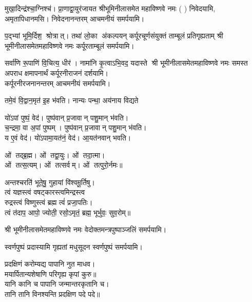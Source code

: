 \begin{center}
 {मुखा॒दिन्द्र॑श्चा॒ग्निश्च॑। प्रा॒णाद्वा॒युर॑जायत}
श्रीभूमिनीलासमेत महाविष्णवे नमः (	) निवेदयामि, \\
अमृतापिधानमसि। निवेदनानन्तरम् आचमनीयं समर्पयामि।\medskip

{प॒द्भ्यां भूमि॒र्दिश॒ श्रोत्रात्। तथा॑ लो॒का अ॑कल्पयन्}
{कर्पूरचूर्णसंयुक्तं ताम्बूलं प्रतिगृह्यताम्}
श्री भूमीनीलासमेतमहाविष्णवे नमः कर्पूरताम्बूलं समर्पयामि।\medskip

{सर्वा॑णि रू॒पाणि॑ वि॒चित्य॒ धीर॑। नामा॑नि कृ॒त्वाऽभि॒वद॒\an{} यदास्ते}
श्री भूमीनीलासमेतमहाविष्णवे नमः समस्त अपराध क्षमापनार्थं कर्पूरनीराजनं दर्शयामि।\\
कर्पूरनीरजनानन्तरम् आचमनीयं समर्पयामि।\medskip

 {तमे॒वं वि॒द्वान॒मृत॑ इ॒ह भ॑वति। नान्यः पन्था॒ अय॑नाय विद्यते}

 यो॑ऽपां पुष्पं॒ वेद॑। पुष्प॑वान् प्र॒जावान् पशु॒मान् भ॑वति।\\
च॒न्द्रमा॒ वा अ॒पां पुष्पम्। पुष्प॑वान् प्र॒जावान् पशु॒मान् भ॑वति।\\
य ए॒वं वेद॑। यो॑ऽपामा॒यत॑नं॒ वेद॑। आ॒यत॑नवान् भवति।\medskip

ओं तद्ब्र॒ह्म। ओं तद्वा॒युः। ओं तदा॒त्मा।\\ ओं तत्स॒त्यम्‌।
ओं तत्सर्वम्‌। ओं तत्पुरो॒र्नमः॥\medskip

अन्तश्चरति॑ भूते॒षु॒ गुहायां वि॑श्वमू॒र्तिषु। \\
त्वं यज्ञस्त्वं वषट्कारस्त्वमिन्द्रस्त्व\\ रुद्रस्त्वं विष्णुस्त्वं ब्रह्म त्वं॑ प्रजा॒पतिः। \\
त्वं त॑दाप॒ आपो॒ ज्योती॒ रसो॒ऽमृतं॒ ब्रह्म॒ भूर्भुवः॒ सुव॒रोम्‌॥\medskip

\medskip

श्री भूमीनीलासमेतमहाविष्णवे नमः वेदोक्तमन्त्रपुष्पाञ्जलिं समर्पयामि।\medskip

{स्वर्णपुष्पं प्रदास्यामि गृह्यतां मधुसूदन}
स्वर्णपुष्पं समर्पयामि।\medskip

प्रदक्षिणं करोम्यद्य पापानि नुत माधव।\\
मयार्पितान्यशेषाणि परिगृह्य कृपां कुरु॥\\
 यानि कानि च पापानि जन्मान्तरकृतानि च।\\
तानि तानि विनश्यन्ति प्रदक्षिण पदे पदे॥\medskip


\end{center}
